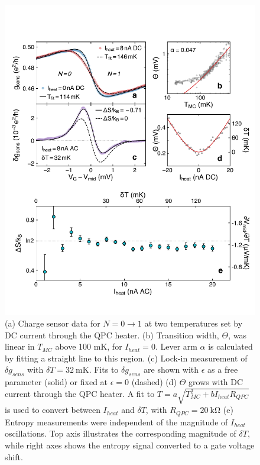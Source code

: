 \documentclass[twocolumn,showpacs,amsmath,amssymb,prl,aps,superscriptaddress]{revtex4-1}
\begin{document}
\begin{figure}[!]
        \includegraphics[width=1.0\columnwidth]{../figures/figure_2.pdf}
        \caption{\label{fig:fig2}(a) Charge sensor data for $N=0 \rightarrow 1$ at two temperatures set by DC current through the QPC heater. (b) Transition width, $\Theta$, was linear in $T_{MC}$ above 100 mK, for $I_{heat}=0$. Lever arm $\alpha$ is calculated by fitting a straight line to this region.  (c) Lock-in measurement of $\delta g_{sens}$ with $\delta T = \SI{32}{\milli\kelvin}$. Fits to $\delta g_{sens}$ are shown with $\epsilon$ as a free parameter (solid) or fixed at $\epsilon=0$ (dashed)  (d) $\Theta$ grows with DC current through the QPC heater. A fit to $T = a\sqrt{T^{2}_{MC}+b I_{heat}R_{QPC}}$ is used to convert between $I_{heat}$ and $\delta T$, with $R_{QPC} = \SI{20}{\kilo\ohm}$ \cite{Mittal1996} (e)  Entropy measurements were independent of the magnitude of $I_{heat}$ oscillations. Top axis illustrates the corresponding magnitude of $\delta T$, while right axes shows the entropy signal converted to a gate voltage shift.}
\end{figure}
\end{document}
